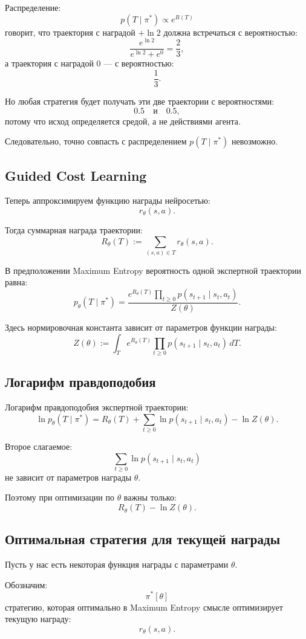 \documentclass[12pt,a4paper]{article}
\begin{document}
Распределение:
\[
p(T\mid\pi^\ast)
\propto e^{R(T)}
\]
говорит, что траектория с наградой $+\ln 2$ должна встречаться с вероятностью:
\[
\frac{e^{\ln 2}}{e^{\ln 2}+e^0}
=
\frac{2}{3},
\]
а траектория с наградой $0$ --- с вероятностью:
\[
\frac{1}{3}.
\]

Но любая стратегия будет получать эти две траектории с вероятностями:
\[
0.5
\quad
\text{и}
\quad
0.5,
\]
потому что исход определяется средой, а не действиями агента.

Следовательно, точно совпасть с распределением $p(T\mid\pi^\ast)$ невозможно.

\subsection{Guided Cost Learning}

Теперь аппроксимируем функцию награды нейросетью:
\[
r_\theta(s,a).
\]

Тогда суммарная награда траектории:
\[
R_\theta(T)
:=
\sum_{(s,a)\in T}
r_\theta(s,a).
\]

В предположении Maximum Entropy вероятность одной экспертной траектории равна:
\[
p_\theta(T\mid\pi^\ast)
=
\frac{
e^{R_\theta(T)}
\prod_{t\ge 0}
p(s_{t+1}\mid s_t,a_t)
}{
Z(\theta)
}.
\]

Здесь нормировочная константа зависит от параметров функции награды:
\[
Z(\theta)
:=
\int_T
e^{R_\theta(T)}
\prod_{t\ge 0}
p(s_{t+1}\mid s_t,a_t)
\,dT.
\]

\subsection{Логарифм правдоподобия}

Логарифм правдоподобия экспертной траектории:
\[
\ln p_\theta(T\mid\pi^\ast)
=
R_\theta(T)
+
\sum_{t\ge 0}
\ln p(s_{t+1}\mid s_t,a_t)
-
\ln Z(\theta).
\]

Второе слагаемое:
\[
\sum_{t\ge 0}
\ln p(s_{t+1}\mid s_t,a_t)
\]
не зависит от параметров награды $\theta$.

Поэтому при оптимизации по $\theta$ важны только:
\[
R_\theta(T)
-
\ln Z(\theta).
\]

\subsection{Оптимальная стратегия для текущей награды}

Пусть у нас есть некоторая функция награды с параметрами $\theta$.

Обозначим:
\[
\pi^\ast[\theta]
\]
стратегию, которая оптимально в Maximum Entropy смысле оптимизирует текущую награду:
\[
r_\theta(s,a).
\]
\end{document}
